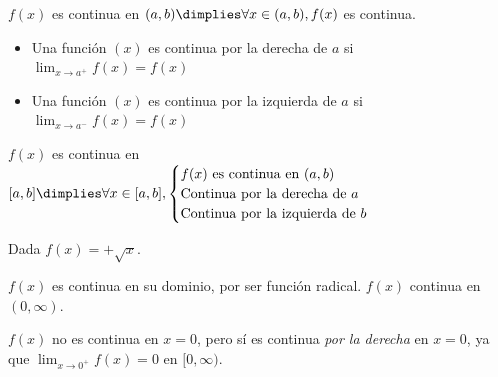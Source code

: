 \begin{defn}
	$f(x)$ es continua en $(a,b) \dimplies \forall x\in(a,b), f(x)$ es continua.
\end{defn}


\begin{defn}
	\begin{itemize}
		\item Una función $(x)$ es continua por la derecha de $a$ si $\displaystyle\lim_{x\to a^+}f(x) = f(x)$
		\item Una función $(x)$ es continua por la izquierda de $a$ si $\displaystyle\lim_{x\to a^-}f(x) = f(x)$
	\end{itemize}
\end{defn}

\begin{defn}
$f(x)$ es continua en $[a,b] \dimplies \forall x\in[a,b],\begin{cases} f(x) \text{ es continua en } (a,b)\\
\text{Continua por la derecha de } a\\
\text{Continua por la izquierda de } b\\\end{cases}$
\end{defn}


\begin{example}
Dada $f(x) = +\sqrt{x}$.

$f(x)$ es continua en su dominio, por ser función radical. $f(x)$ continua en $(0,\infty)$.

$f(x)$ no es continua en $x=0$, pero sí es continua \textit{por la derecha} en $x=0$, ya que $\displaystyle\lim_{x\to 0^+} f(x) = 0$ en $[0,\infty)$.
\end{example}


